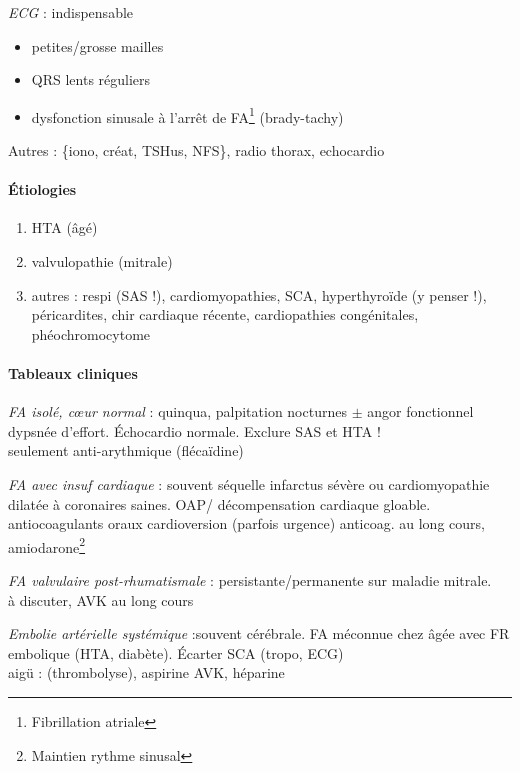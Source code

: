 \textit{ECG} : indispensable \danger
\begin{itemize}
  \item petites/grosse mailles
  \item QRS lents réguliers
  \item dysfonction sinusale à l'arrêt de FA\footnote{Fibrillation atriale}
    (brady-tachy)
\end{itemize}

Autres : \{iono, créat, TSHus, NFS\}, radio thorax, echocardio

\paragraph{Étiologies}
\begin{enumerate}
  \item HTA (âgé)
  \item valvulopathie (mitrale)
  \item autres : respi (SAS !), cardiomyopathies, SCA, hyperthyroïde (y penser
    !), péricardites, chir cardiaque récente, cardiopathies congénitales,
    phéochromocytome
\end{enumerate}

\paragraph{Tableaux cliniques}
\textit{FA isolé, c\oe{}ur normal} : quinqua, palpitation nocturnes $\pm$ angor
fonctionnel \lor{} dypsnée d'effort. Échocardio normale. Exclure SAS et HTA !\\
\thus seulement anti-arythmique (flécaïdine)

\textit{FA avec insuf cardiaque} : souvent séquelle infarctus sévère ou
cardiomyopathie dilatée à coronaires saines. OAP/ décompensation cardiaque
gloable.\\
\thus antiocoagulants oraux \arrow{} cardioversion (parfois urgence) \arrow{}
anticoag. au long cours, amiodarone\footnote{Maintien rythme sinusal}

\textit{FA valvulaire post-rhumatismale}  : persistante/permanente sur maladie
mitrale. \\
\thus à discuter, AVK au long cours

\textit{Embolie artérielle systémique} :souvent cérébrale. FA méconnue chez
\female âgée avec FR embolique (HTA, diabète). Écarter SCA (tropo, ECG)\\
\thus aigü : (thrombolyse), aspirine \arrow{} AVK, héparine

